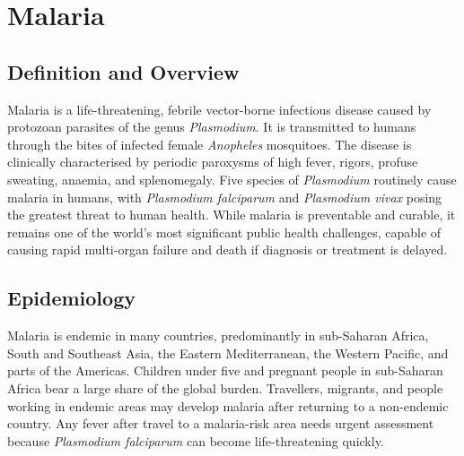 \chapter{Malaria}

\section*{Definition and Overview}
Malaria is a life-threatening, febrile vector-borne infectious disease caused by protozoan parasites of the genus \textit{Plasmodium}. It is transmitted to humans through the bites of infected female \textit{Anopheles} mosquitoes. The disease is clinically characterised by periodic paroxysms of high fever, rigors, profuse sweating, anaemia, and splenomegaly. Five species of \textit{Plasmodium} routinely cause malaria in humans, with \textit{Plasmodium falciparum} and \textit{Plasmodium vivax} posing the greatest threat to human health. While malaria is preventable and curable, it remains one of the world's most significant public health challenges, capable of causing rapid multi-organ failure and death if diagnosis or treatment is delayed.

\section*{Epidemiology}
Malaria is endemic in many countries, predominantly in sub-Saharan Africa, South and Southeast Asia, the Eastern Mediterranean, the Western Pacific, and parts of the Americas. Children under five and pregnant people in sub-Saharan Africa bear a large share of the global burden. Travellers, migrants, and people working in endemic areas may develop malaria after returning to a non-endemic country. Any fever after travel to a malaria-risk area needs urgent assessment because \textit{Plasmodium falciparum} can become life-threatening quickly.

